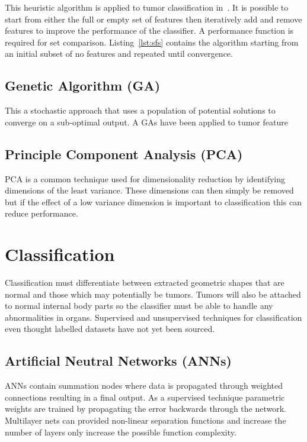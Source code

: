\documentclass[journal]{IEEEtran}
\begin{document}
This heuristic algorithm is applied to tumor classification in~\cite{hau07feat}.
It is possible to start from either the full or empty set of features then iteratively add and remove features to improve the performance of the classifier. 
A performance function is required for set comparison. 
Listing~\ref{lst:sfs} contains the algorithm starting from an initial subset of no features and repeated until convergence.




\subsection{Genetic Algorithm (GA)}
This a stochastic approach that uses a population of potential solutions to converge on a sub-optimal output.
A GAs have been applied to tumor feature  



\subsection{Principle Component Analysis (PCA)}
PCA is a common technique used for dimensionality reduction by identifying dimensions of the least variance. 
These dimensions can then simply be removed but if the effect of a low variance dimension is important to classification this can reduce performance.





\section{Classification}
\label{sec:class}

Classification must differentiate between extracted geometric shapes that are normal and those which may potentially be tumors.
Tumors will also be attached to normal internal body parts so the classifier must be able to handle any abnormalities in organs.
Supervised and unsupervised techniques for classification even thought labelled datasets have not yet been sourced.


\subsection{Artificial Neutral Networks (ANNs)}
ANNs contain summation nodes where data is propagated through weighted connections resulting in a final output. 
As a supervised technique parametric weights are trained by propagating the error backwards through the network.
Multilayer nets can provided non-linear separation functions and increase the number of layers only increase the possible function complexity.
\end{document}
